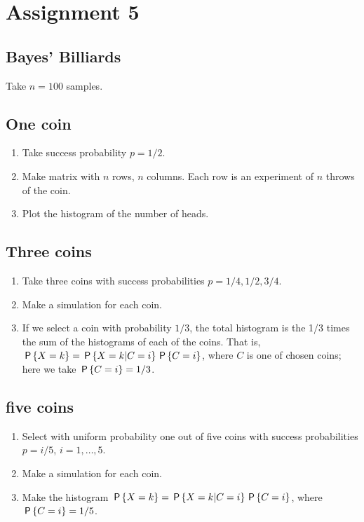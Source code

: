 \documentclass[../../assignments/assignments]{subfiles}
\begin{document}
\section{Assignment 5}



\subsection{Bayes' Billiards}

Take \(n=100\) samples.

\subsection{One coin}

\begin{enumerate}
\item Take success probability \(p=1/2\).
\item Make matrix with \(n\) rows, \(n\) columns. Each row is an experiment of \(n\) throws of the coin.
\item Plot the histogram of the number of heads.
\end{enumerate}

\subsection{Three coins}

\begin{enumerate}
\item Take three coins with success probabilities \(p=1/4, 1/2, 3/4\).
\item Make a simulation for each coin.
\item If we select a coin with probability \(1/3\), the total histogram is the 1/3 times the sum of the histograms of each of the coins. That is, \(\P{X=k} = \P{X=k|C = i}\P{C=i}\), where \(C\) is one of chosen coins;  here we take \(\P{C=i} = 1/3\).
\end{enumerate}

\subsection{five coins}
\begin{enumerate}
\item Select with uniform probability one out of five coins with success probabilities \(p=i/5\),  \(i=1,\ldots, 5\).
\item Make a simulation for each coin.
\item Make the histogram \(\P{X=k} = \P{X=k|C = i}\P{C=i}\), where \(\P{C=i} = 1/5\).
\end{enumerate}
\end{document}
